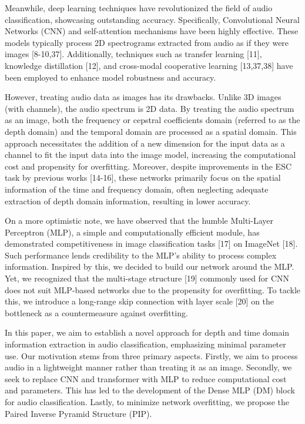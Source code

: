 \documentclass[runningheads]{llncs}
\begin{document}
  Meanwhile, deep learning techniques have revolutionized the field of audio classification, showcasing outstanding accuracy. Specifically, Convolutional Neural Networks (CNN) and self-attention mechanisms have been highly effective. These models typically process 2D spectrograms extracted from audio as if they were images [8-10,37]. Additionally, techniques such as transfer learning [11], knowledge distillation [12], and cross-modal cooperative learning [13,37,38] have been employed to enhance model robustness and accuracy.

    However, treating audio data as images has its drawbacks. Unlike 3D images (with channels), the audio spectrum is 2D data. By treating the audio spectrum as an image, both the frequency or cepstral coefficients domain (referred to as the depth domain) and the temporal domain are processed as a spatial domain. This approach necessitates the addition of a new dimension for the input data as a channel to fit the input data into the image model, increasing the computational cost and propensity for overfitting. 
     Moreover, despite improvements in the ESC task by previous works [14-16], these networks primarily focus on the spatial information of the time and frequency domain, often neglecting adequate extraction of depth domain information, resulting in lower accuracy.

  On a more optimistic note, we have observed that the humble Multi-Layer Perceptron (MLP), a simple and computationally efficient module, has demonstrated competitiveness in image classification tasks [17] on ImageNet [18]. Such performance lends credibility to the MLP's ability to process complex information. Inspired by this, we decided to build our network around the MLP. Yet, we recognized that the multi-stage structure [19] commonly used for CNN does not suit MLP-based networks due to the propensity for overfitting. To tackle this, we introduce a long-range skip connection with layer scale [20] on the bottleneck as a countermeasure against overfitting.

In this paper, we aim to establish a novel approach for depth and time domain information extraction in audio classification, emphasizing minimal parameter use. Our motivation stems from three primary aspects. Firstly, we aim to process audio in a lightweight manner rather than treating it as an image. Secondly, we seek to replace CNN and transformer with MLP to reduce computational cost and parameters. This has led to the development of the Dense MLP (DM) block for audio classification. Lastly, to minimize network overfitting, we propose the Paired Inverse Pyramid Structure (PIP).
\end{document}
